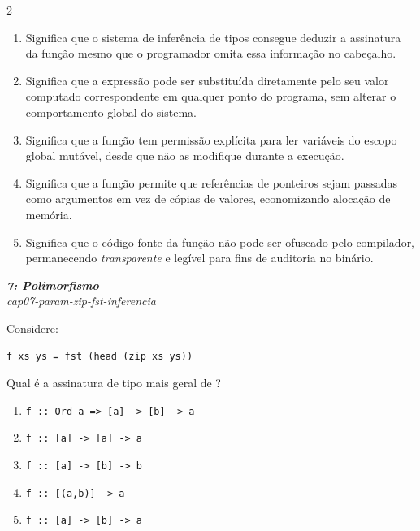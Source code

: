 \documentclass[a4paper,10pt,brazil]{article}
\begin{document}
\begin{multicols}{2}
\begin{enumerate}
  \item Significa que o sistema de inferência de tipos consegue deduzir a assinatura da função mesmo que o programador omita essa informação no cabeçalho.

  \item Significa que a expressão pode ser substituída diretamente pelo seu valor computado correspondente em qualquer ponto do programa, sem alterar o comportamento global do sistema.

  \item Significa que a função tem permissão explícita para ler variáveis do escopo global mutável, desde que não as modifique durante a execução.

  \item Significa que a função permite que referências de ponteiros sejam passadas como argumentos em vez de cópias de valores, economizando alocação de memória.

  \item Significa que o código-fonte da função não pode ser ofuscado pelo compilador, permanecendo \emph{transparente} e legível para fins de auditoria no binário.


\end{enumerate}

\begin{flushright}
  \footnotesize
  \textit{\textbf{7: Polimorfismo}}\\
  \textit{cap07-param-zip-fst-inferencia}\\

\end{flushright}
Considere:

\begin{verbatim}
f xs ys = fst (head (zip xs ys))
\end{verbatim}

Qual é a assinatura de tipo mais geral de ?

\begin{enumerate}
  \item \texttt{f :: Ord a => [a] -> [b] -> a}
  \item \texttt{f :: [a] -> [a] -> a}
  \item \texttt{f :: [a] -> [b] -> b}
  \item \texttt{f :: [(a,b)] -> a}
  \item \texttt{f :: [a] -> [b] -> a}


\end{enumerate}
\end{multicols}
\end{document}
